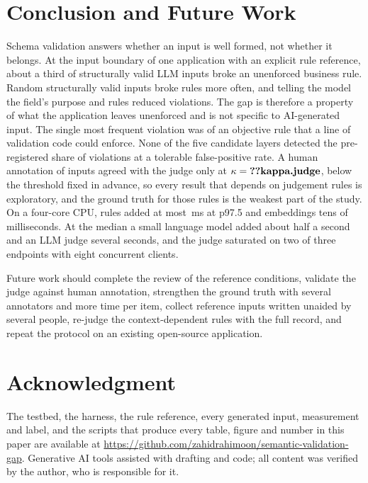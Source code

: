 \documentclass[conference]{IEEEtran}
\begin{document}
\section{Conclusion and Future Work}
\label{sec:conclusion}

Schema validation answers whether an input is well formed, not whether it belongs. At the input
boundary of one application with an explicit rule reference, about a third of structurally valid LLM
inputs broke an unenforced business rule. Random structurally valid inputs broke rules more often, and
telling the model the field's purpose and rules reduced violations. The gap is therefore a property of
what the application leaves unenforced and is not specific to AI-generated input. The single most
frequent violation was of an objective rule that a line of validation code could enforce. None of the
five candidate layers detected the pre-registered share of violations at a tolerable false-positive
rate.\ifjudgeweak{} A human annotation of  inputs agreed with the judge only at
$\kappa=\R{kappa.judge}$, below the threshold fixed in advance, so every result that depends on
judgement rules is exploratory, and the ground truth for those rules is the weakest part of the
study.\fi{} On a four-core CPU, rules added at most \,ms at p97.5 and embeddings tens
of milliseconds. At the median a small language model added about half a second and an LLM judge
several seconds, and the judge saturated on two of three endpoints with eight concurrent clients.

Future work should \ifreviewed\else complete the review of the reference conditions, \fi
\ifhumanlabels\else validate the judge against human annotation, \fi strengthen the ground truth with
several annotators and more time per item, collect reference inputs written unaided by several people,
re-judge the context-dependent rules with the full record, and repeat the protocol on an existing
open-source application.

\section*{Acknowledgment}

The testbed, the harness, the rule reference, every generated input, measurement and label, and the
scripts that produce every table, figure and number in this paper are available at
\url{https://github.com/zahidrahimoon/semantic-validation-gap}. Generative AI tools assisted with
drafting and code; all content was verified by the author, who is responsible for it.



\end{document}
